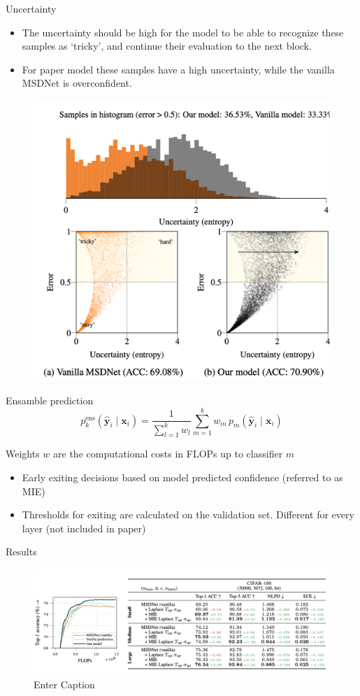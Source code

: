 \documentclass[aspectratio=169,xcolor=dvipsnames]{beamer}
\begin{document}
\begin{frame}{Uncertainty}
    \begin{itemize}
        \item The uncertainty should be high for the model to be able to recognize these samples as ‘tricky’, and continue their evaluation to the next block.
        \item For paper model these samples have a high uncertainty, while the vanilla MSDNet is overconfident.
    \end{itemize}
    \begin{figure}
        \centering
        \includegraphics[width=0.35\linewidth]{figs/Screenshot 2025-04-08 at 15.25.23.png}
        \label{fig:enter-label}
    \end{figure}
\end{frame}

\begin{frame}{Ensamble prediction}
    \[
        p_k^{\text{ens}}(\hat{\mathbf{y}}_i \mid \mathbf{x}_i) =
        \frac{1}{\sum_{l=1}^{k} w_l} \sum_{m=1}^{k} w_m \, p_m(\hat{\mathbf{y}}_i \mid \mathbf{x}_i)
    \]

    \vspace{1mm}
    Weights \( w \) are the computational costs in FLOPs up to classifier \( m \)

    \vspace{3mm}
    \begin{itemize}
        \item Early exiting decisions based on model predicted confidence (referred to as MIE)
        \item Thresholds for exiting are calculated on the validation set. Different for every layer (not included in paper)
    \end{itemize}

\end{frame}

\begin{frame}{Results}

    \begin{figure}
        \centering
        \includegraphics[width=0.8\linewidth]{figs/Screenshot 2025-04-08 at 15.40.28.png}
        \caption{Enter Caption}
        \label{fig:enter-label}
    \end{figure}

\end{frame}
\end{document}
